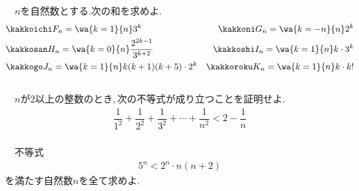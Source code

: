 \documentclass[10pt,fleqn,a4paper]{jsarticle}
\begin{document}
\reibanichi　$nを自然数とする.次の和を求めよ.$
\begin{align*}
    &\kakkoichi F_n=\wa{k=1}{n}3^k &\kakkoni G_n=\wa{k=-n}{n}2^k\\
    &\kakkosan H_n=\wa{k=0}{n}\dfrac{2^{2k-1}}{3^{k+2}}&\kakkoshi I_n=\wa{k=1}{n}k\cdot3^k\\
    &\kakkogo J_n=\wa{k=1}{n}k(k+1)(k+5)\cdot2^k &\kakkoroku K_n=\wa{k=1}{n}k\cdot k!  
\end{align*}\\
\reibanni　$nが2以上の整数のとき,次の不等式が成り立つことを証明せよ.$
\begin{align*}
    \dfrac{1}{1^2}+\dfrac{1}{2^2}+\dfrac{1}{3^2}+\cdots+\dfrac{1}{n^2}<2-\dfrac{1}{n}
\end{align*}\\
\reibansan　不等式
\begin{align*}
    5^n<2^n\cdot n(n+2)
\end{align*}
を満たす自然数$n$を全て求めよ.
\newpage
\end{document}
